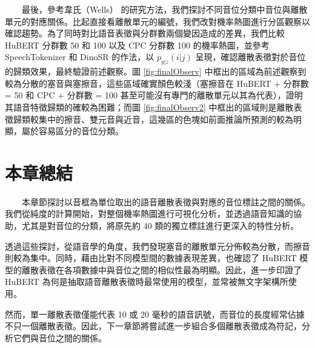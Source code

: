 　　最後，參考韋氏（Wells） \cite{wells_phonetic_2022} 的研究方法，我們探討不同音位分類中音位與離散單元的對應關係。比起直接看離散單元的編號，我們改對機率熱圖進行分區觀察以確認趨勢。為了同時對比語音表徵與分群數兩個變因造成的差異，我們比較 HuBERT 分群數 50 和 100 以及 CPC 分群數 100 的機率熱圖，並參考 SpeechTokenizer \cite{zhang2024speechtokenizer} 和 DinoSR \cite{liu2024dinosr} 的作法，以 $p_{y|z}(i|j)$ 呈現，確認離散表徵對於音位的歸類效果，最終驗證前述觀察。圖 \ref{fig:finalObserv} 中框出的區域為前述觀察到較為分散的塞音與塞擦音，這些區域確實顏色較淺（塞擦音在 HuBERT + 分群數 = 50 和 CPC + 分群數 = 100 甚至可能沒有專門的離散單元以其為代表），證明其語音特徵歸類的確較為困難；而圖 \ref{fig:finalObserv2} 中框出的區域則是離散表徵歸類較集中的擦音、雙元音與近音，這幾區的色塊如前面推論所預測的較為明顯，屬於容易區分的音位分類。


\section{本章總結}

　　本章節探討以音框為單位取出的語音離散表徵與對應的音位標註之間的關係。我們從純度的計算開始，對整個機率熱圖進行可視化分析，並透過語音知識的協助，尤其是對音位的分類，將原先約 40 類的獨立標註進行更深入的特性分析。

        透過這些探討，從語音學的角度，我們發現塞音的離散單元分佈較為分散，而擦音則較為集中。同時，藉由比對不同模型間的數據表現差異，也確認了 HuBERT 模型的離散表徵在各項數據中與音位之間的相似性最為明顯。因此，進一步印證了 HuBERT 為何是抽取語音離散表徵時最常使用的模型，並常被無文字架構所使用。

        然而，單一離散表徵僅能代表 10 或 20 毫秒的語音訊號，而音位的長度經常佔據不只一個離散表徵。因此，下一章節將嘗試進一步組合多個離散表徵成為符記，分析它們與音位之間的關係。

